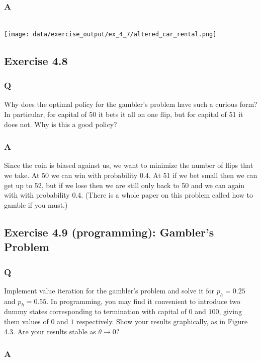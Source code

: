 \subsubsection{A}
\ProgrammingExercise\\
\texttt{[image: data/exercise\_output/ex\_4\_7/altered\_car\_rental.png]}

\subsection{Exercise 4.8}
\subsubsection{Q}
Why does the optimal policy for the gambler’s problem have such a curious form? In particular, for capital of 50 it bets it all on one flip, but for capital of 51 it does not. Why is this a good policy?

\subsubsection{A}
Since the coin is biased against us, we want to minimize the number of flips that we take. At 50 we can win with probability 0.4. At 51 if we bet small then we can get up to 52, but if we lose then we are still only back to 50 and we can again with with probability 0.4. (There is a whole paper on this problem called how to gamble if you must.)


\subsection{Exercise 4.9 (programming): Gambler's Problem}
\subsubsection{Q}
Implement value iteration for the gambler's problem and solve it for $p_h = 0.25$ and $p_h = 0.55$. In programming, you may find it convenient to introduce two dummy states corresponding to termination with capital of $0$ and $100$, giving them values of $0$ and $1$ respectively. Show your results graphically, as in Figure 4.3. Are your results stable as $\theta \to 0$?

\subsubsection{A}
\ProgrammingExercise\\

